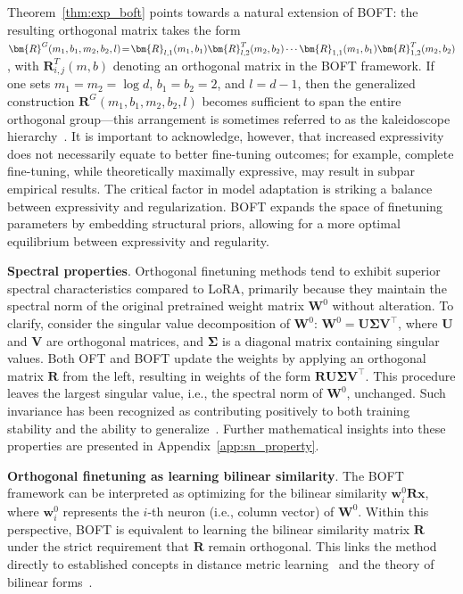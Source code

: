 Theorem~\ref{thm:exp_boft} points towards a natural extension of BOFT: the resulting orthogonal matrix takes the form $\thickmuskip=2mu \medmuskip=2mu \bm{R}^G(m_1,b_1,m_2,b_2,l)=\bm{R}_{l,1}(m_1,b_1)\bm{R}_{l,2}^T(m_2,b_2)\cdots\bm{R}_{1,1}(m_1,b_1)\bm{R}_{1,2}^T(m_2,b_2)$, with $\bm{R}_{i,j}^T(m,b)$ denoting an orthogonal matrix in the BOFT framework. If one sets $m_1=m_2=\log d$, $b_1=b_2=2$, and $l=d-1$, then the generalized construction $\bm{R}^G(m_1,b_1,m_2,b_2,l)$ becomes sufficient to span the entire orthogonal group—this arrangement is sometimes referred to as the kaleidoscope hierarchy~\cite{dao2019kaleidoscope}. It is important to acknowledge, however, that increased expressivity does not necessarily equate to better fine-tuning outcomes; for example, complete fine-tuning, while theoretically maximally expressive, may result in subpar empirical results. The critical factor in model adaptation is striking a balance between expressivity and regularization. BOFT expands the space of finetuning parameters by embedding structural priors, allowing for a more optimal equilibrium between expressivity and regularity.

\textbf{Spectral properties}. Orthogonal finetuning methods tend to exhibit superior spectral characteristics compared to LoRA, primarily because they maintain the spectral norm of the original pretrained weight matrix $\bm{W}^0$ without alteration. To clarify, consider the singular value decomposition of $\bm{W}^0$: $\bm{W}^0=\bm{U}\bm{\Sigma}\bm{V}^\top$, where $\bm{U}$ and $\bm{V}$ are orthogonal matrices, and $\bm{\Sigma}$ is a diagonal matrix containing singular values. Both OFT and BOFT update the weights by applying an orthogonal matrix $\bm{R}$ from the left, resulting in weights of the form $\bm{R}\bm{U}\bm{\Sigma}\bm{V}^\top$. This procedure leaves the largest singular value, i.e., the spectral norm of $\bm{W}^0$, unchanged. Such invariance has been recognized as contributing positively to both training stability and the ability to generalize~\cite{miyato2018spectral,yoshida2017spectral}. Further mathematical insights into these properties are presented in Appendix~\ref{app:sn_property}.

\textbf{Orthogonal finetuning as learning bilinear similarity}. The BOFT framework can be interpreted as optimizing for the bilinear similarity $\bm{w}^0_i\bm{R}\bm{x}$, where $\bm{w}^0_i$ represents the $i$-th neuron (i.e., column vector) of $\bm{W}^0$. Within this perspective, BOFT is equivalent to learning the bilinear similarity matrix $\bm{R}$ under the strict requirement that $\bm{R}$ remain orthogonal. This links the method directly to established concepts in distance metric learning~\cite{xing2002distance} and the theory of bilinear forms~\cite{roman2005advanced}.

